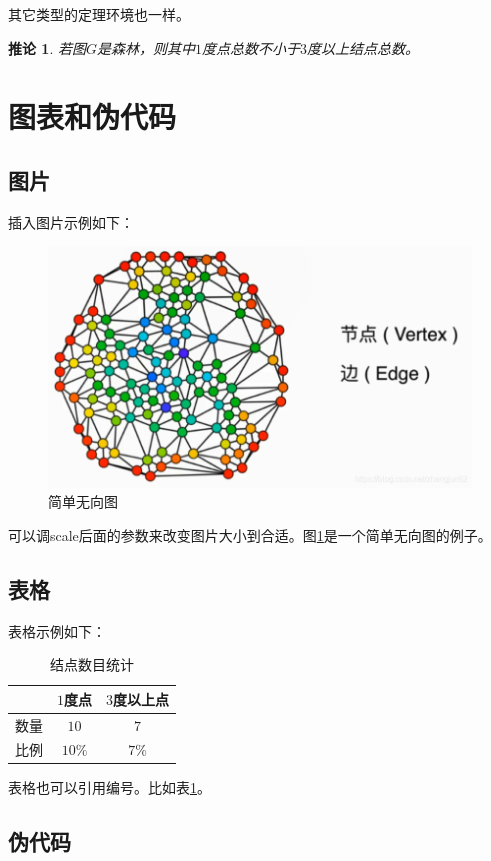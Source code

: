 \documentclass{ctexart}
\newtheorem{corollary}{推论}
\begin{document}
其它类型的定理环境也一样。
\begin{corollary}
	若图$G$是森林，则其中$1$度点总数不小于$3$度以上结点总数。
\end{corollary}

\section{图表和伪代码}
\subsection{图片}
插入图片示例如下：
\begin{figure}
	\centering
	\includegraphics[scale=0.2]{example.png}
	\caption{简单无向图} \label{fig:gp} %
\end{figure}
可以调scale后面的参数来改变图片大小到合适。图\ref{fig:gp}是一个简单无向图的例子。

\subsection{表格}
表格示例如下：
\begin{table}[h!]
	\centering
	\begin{tabular}{c c c}
		\hline
		   & $1$度点  & $3$度以上点 \\
		\hline
		数量 & $10$   & $7$     \\
		比例 & $10\%$ & $7\%$   \\
		\hline
	\end{tabular}
	\caption{结点数目统计}
	\label{tab:nn}
\end{table}
表格也可以引用编号。比如表\ref{tab:nn}。

\subsection{伪代码}
\end{document}
